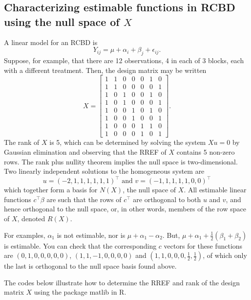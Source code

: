 \documentclass[
]{book}
\begin{document}
\hypertarget{characterizing-estimable-functions-in-rcbd-using-the-null-space-of-x}{%
\subsection{\texorpdfstring{Characterizing estimable functions in RCBD using the null space of \(X\)}{Characterizing estimable functions in RCBD using the null space of X}}\label{characterizing-estimable-functions-in-rcbd-using-the-null-space-of-x}}

A linear model for an RCBD is
\[Y_{ij} = \mu + \alpha_i + \beta_j + \epsilon_{ij}.\]
Suppose, for example, that there are 12 observations, 4 in each of 3 blocks, each with a different treatment. Then, the design matrix may be written
\[X = \begin{bmatrix}
1 & 1 & 0 & 0 & 0 & 1 & 0\\
1 & 1 & 0 & 0 & 0 & 0 & 1\\
1 & 0 & 1 & 0 & 0 & 1 & 0\\
1 & 0 & 1 & 0 & 0 & 0 & 1\\
1 & 0 & 0 & 1 & 0 & 1 & 0\\
1 & 0 & 0 & 1 & 0 & 0 & 1\\
1 & 0 & 0 & 0 & 1 & 1 & 0\\
1 & 0 & 0 & 0 & 1 & 0 & 1
\end{bmatrix}.\]
The rank of \(X\) is 5, which can be determined by solving the system \(Xu = 0\) by Gaussian elimination and observing that the RREF of \(X\) contains 5 non-zero rows. The rank plus nullity theorem implies the null space is two-dimensional. Two linearly independent solutions to the homogeneous system are
\[u = (-2,1,1,1,1,1,1)^\top \text{ and } v = (-1,1,1,1,1,0,0)^\top\]
which together form a basis for \(N(X)\), the null space of \(X\). All estimable linear functions \(c^\top \beta\) are such that the rows of \(c^\top\) are orthogonal to both \(u\) and \(v\), and hence orthogonal to the null space, or, in other words, members of the row space of \(X\), denoted \(R(X)\).

For examples, \(\alpha_1\) is not estimable, nor is \(\mu + \alpha_1 - \alpha_2\). But, \(\mu + \alpha_1 + \tfrac12(\beta_1 + \beta_2)\) is estimable. You can check that the corresponding \(c\) vectors for these functions are \((0,1,0,0,0,0,0)\), \((1,1,-1,0,0,0,0)\) and \((1,1,0,0,0,\tfrac12,\tfrac12)\), of which only the last is orthogonal to the null space basis found above.

The codes below illustrate how to determine the RREF and rank of the design matrix \(X\) using the package matlib in R.
\end{document}
